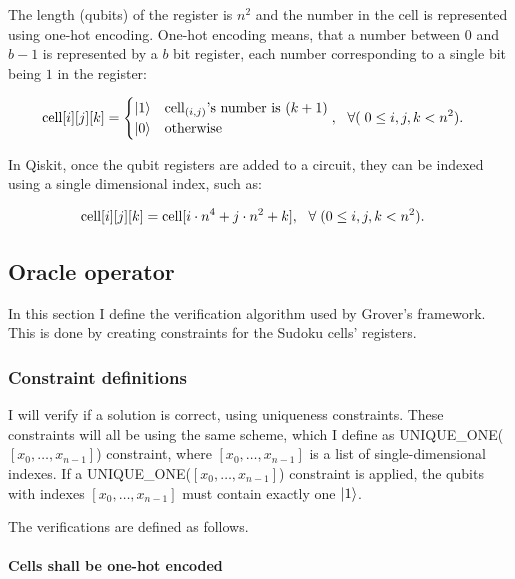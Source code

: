 The length (qubits) of the register is $n^2$ and the number in the cell is represented using one-hot encoding. One-hot encoding means, that a number between $0$ and $b-1$ is represented by a $b$ bit register, each number corresponding to a single bit being $1$ in the register:

\begin{align*}
\text{cell}[i][j][k] = \begin{cases}
\ket{1} & \text{cell}_{(i,j)}\text{'s number is }(k+1) \\
\ket{0} & \text{otherwise}
\end{cases}, & \hspace{3mm}\forall{}(\hspace{1mm}0\leq{}i,j,k<n^2).
\end{align*}

In Qiskit, once the qubit registers are added to a circuit, they can be indexed using a single dimensional index, such as:

\begin{align*}
\text{cell}[i][j][k] = \text{cell}[i\cdot{}n^4+j\cdot{}n^2+k], & \hspace{3mm}\forall{}\hspace{1mm}(0\leq{}i,j,k<n^2).
\end{align*}

\subsection{Oracle operator}

In this section I define the verification algorithm used by Grover's framework. This is done by creating constraints for the Sudoku cells' registers.

\subsubsection{Constraint definitions}

I will verify if a solution is correct, using uniqueness constraints. These constraints will all be using the same scheme, which I define as UNIQUE\_ONE($[x_0,\dots,{}x_{n-1}]$) constraint, where $[x_0,\dots,{}x_{n-1}]$ is a list of single-dimensional indexes. If a UNIQUE\_ONE($[x_0,\dots,{}x_{n-1}]$) constraint is applied, the qubits with indexes $[x_0,\dots,{}x_{n-1}]$ must contain exactly one $\ket{1}$.

The verifications are defined as follows.

\paragraph{Cells shall be one-hot encoded}\mbox{}\\

